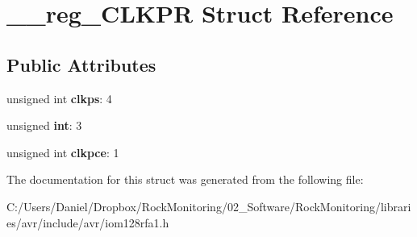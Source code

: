 \hypertarget{struct____reg___c_l_k_p_r}{}\section{\+\_\+\+\_\+reg\+\_\+\+C\+L\+K\+PR Struct Reference}
\label{struct____reg___c_l_k_p_r}
\subsection*{Public Attributes}
\begin{DoxyCompactItemize}
\item 
unsigned int {\bfseries clkps}\+: 4\hypertarget{struct____reg___c_l_k_p_r_ae0d47c1387847209b8391397a1a18b25}{}\label{struct____reg___c_l_k_p_r_ae0d47c1387847209b8391397a1a18b25}

\item 
unsigned {\bfseries int}\+: 3\hypertarget{struct____reg___c_l_k_p_r_aa01dce486ddc7492bde135c63a40de2c}{}\label{struct____reg___c_l_k_p_r_aa01dce486ddc7492bde135c63a40de2c}

\item 
unsigned int {\bfseries clkpce}\+: 1\hypertarget{struct____reg___c_l_k_p_r_a58bd80a3dbbc175e52abd77f81537d2d}{}\label{struct____reg___c_l_k_p_r_a58bd80a3dbbc175e52abd77f81537d2d}

\end{DoxyCompactItemize}


The documentation for this struct was generated from the following file\+:\begin{DoxyCompactItemize}
\item 
C\+:/\+Users/\+Daniel/\+Dropbox/\+Rock\+Monitoring/02\+\_\+\+Software/\+Rock\+Monitoring/libraries/avr/include/avr/iom128rfa1.\+h\end{DoxyCompactItemize}
